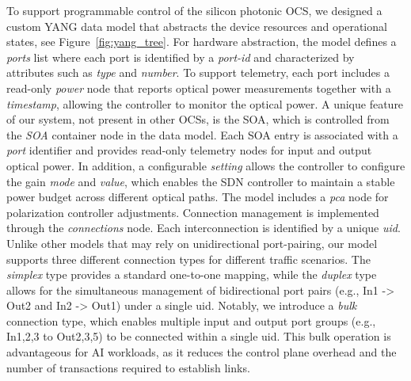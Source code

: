 To support programmable control of the silicon photonic OCS, we designed a custom YANG data model that abstracts the device resources and operational states, see Figure~\ref{fig:yang_tree}.
For hardware abstraction, the model defines a \textit{ports} list where each port is identified by a \textit{port-id} and characterized by attributes such as \textit{type} and \textit{number}.
To support telemetry, each port includes a read-only \textit{power} node that reports optical power measurements together with a \textit{timestamp}, allowing the controller to monitor the optical power.
A unique feature of our system, not present in other OCSs, is the SOA, which is controlled from the \textit{SOA} container node in the data model.
Each SOA entry is associated with a \textit{port} identifier and provides read-only telemetry nodes for input and output optical power.
In addition, a configurable \textit{setting} allows the controller to configure the gain \textit{mode} and \textit{value}, which enables the SDN controller to maintain a stable power budget across different optical paths.
The model includes a \textit{pca} node for polarization controller adjustments.
Connection management is implemented through the \textit{connections} node.
Each interconnection is identified by a unique \textit{uid}.
Unlike other models that may rely on unidirectional port-pairing, our model supports three different connection types for different traffic scenarios.
The \textit{simplex} type provides a standard one-to-one mapping, while the \textit{duplex} type allows for the simultaneous management of bidirectional port pairs (e.g., In1 -> Out2 and In2 -> Out1) under a single uid.
Notably, we introduce a \textit{bulk} connection type, which enables multiple input and output port groups (e.g., In1,2,3 to Out2,3,5) to be connected within a single uid.
This bulk operation is advantageous for AI workloads, as it reduces the control plane overhead and the number of transactions required to establish links.


